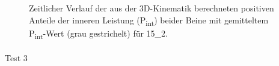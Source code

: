 \documentclass[
  letterpaper,
  DIV=11]{scrartcl}
\makeatletter
\let\oldparagraph\paragraph
\renewcommand{\paragraph}{
    \@ifstar
      \xxxParagraphStar
      \xxxParagraphNoStar
  }
\newcommand{\xxxParagraphStar}[1]{\oldparagraph*{#1}\mbox{}}
\newcommand{\xxxParagraphNoStar}[1]{\oldparagraph{#1}\mbox{}}
\makeatother
\begin{document}
\begin{figure}


\caption{\label{fig-PInt_Kinematik_15_2}Zeitlicher Verlauf der aus der
3D-Kinematik berechneten positiven Anteile der inneren Leistung
(P\textsubscript{int}) beider Beine mit gemitteltem
P\textsubscript{int}-Wert (grau gestrichelt) für 15\_2.}

\end{figure}%

\paragraph{Test 3}
\end{document}
